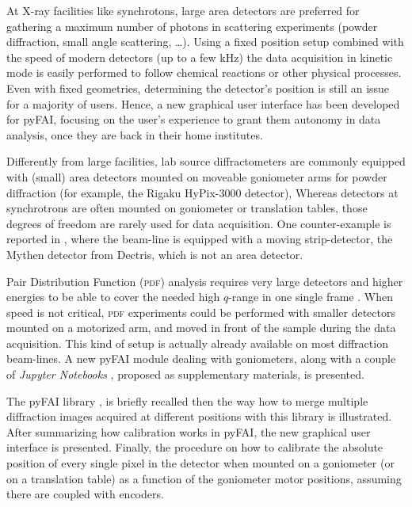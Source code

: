\documentclass[preprint, pdf]{iucr}              %
\begin{document}
At X-ray facilities like synchrotons, large area detectors are 
preferred for gathering a maximum number of photons in
scattering experiments (powder diffraction, small angle
scattering, \ldots).
Using a fixed position setup combined with the speed of modern detectors (up
to a few kHz) the data acquisition in kinetic mode is easily performed to 
follow chemical reactions or other physical processes.
Even with fixed geometries, determining the detector's position is
still an issue for a majority of users. 
Hence, a new graphical user interface has been developed for pyFAI, focusing
on the user's experience to grant them autonomy in data analysis, once they
are back in their home institutes.

Differently from large facilities, lab source diffractometers
are commonly equipped with (small) area detectors mounted on moveable goniometer
arms for powder diffraction (for example, the Rigaku HyPix-3000 detector),
Whereas detectors at synchrotrons are often mounted on goniometer or
translation tables, those degrees of freedom are rarely used for data
acquisition.
One counter-example is reported in \cite{Gao:kc5032}, where the beam-line
is equipped with a moving strip-detector, the Mythen detector from Dectris,
which is not an area detector.




Pair Distribution Function (\textsc{pdf}) analysis requires very large
detectors and higher energies to be able to cover the needed high $q$-range in
one single frame \cite{Chupas:wf5000}.
When speed is not critical, \textsc{pdf} experiments could be performed
with smaller detectors mounted on a motorized arm, and moved in front of
the sample during the data acquisition. 
This kind of setup is actually already available on most diffraction
beam-lines. 
A new pyFAI module dealing with goniometers, along with
a couple of \textit{Jupyter Notebooks}
\cite{ipython}, proposed as supplementary materials, is presented.

The pyFAI library \cite{fv5028}, is briefly recalled then the way how to
merge multiple diffraction images acquired at different positions with this
library \cite{PyFAI_PDJ} is illustrated. 
After summarizing how calibration works in pyFAI, the new graphical user
interface is presented.
Finally, the procedure on how to calibrate the absolute position of
every single pixel in the detector when mounted on a goniometer (or on a
translation table) as a function of the goniometer motor positions, assuming
there are coupled with encoders. 
\end{document}
